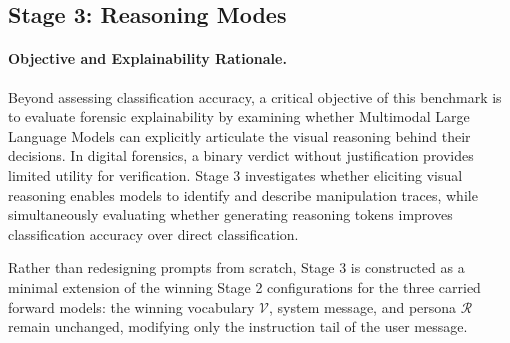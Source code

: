 \subsection{Stage 3: Reasoning Modes}
\label{subsec:stage3_reasoning}

\paragraph{Objective and Explainability Rationale.}
Beyond assessing classification accuracy, a critical objective of this benchmark is to evaluate forensic explainability by examining whether Multimodal Large Language Models can explicitly articulate the visual reasoning behind their decisions. In digital forensics, a binary verdict without justification provides limited utility for verification. Stage 3 investigates whether eliciting visual reasoning enables models to identify and describe manipulation traces, while simultaneously evaluating whether generating reasoning tokens improves classification accuracy over direct classification.

Rather than redesigning prompts from scratch, Stage 3 is constructed as a minimal extension of the winning Stage 2 configurations for the three carried forward models: the winning vocabulary $\mathcal{V}$, system message, and persona $\mathcal{R}$ remain unchanged, modifying only the instruction tail of the user message.

